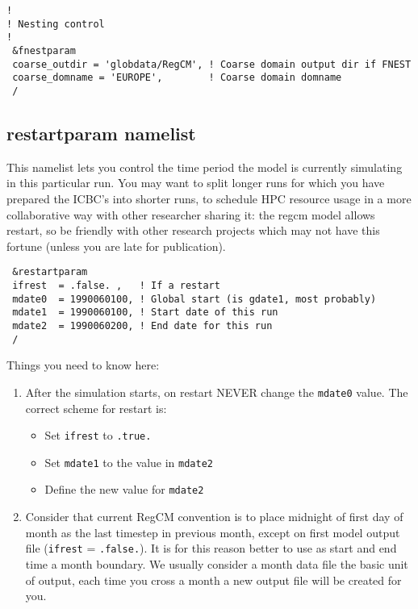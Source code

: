 {\footnotesize
\begin{Verbatim}
!
! Nesting control
!
 &fnestparam
 coarse_outdir = 'globdata/RegCM', ! Coarse domain output dir if FNEST
 coarse_domname = 'EUROPE',        ! Coarse domain domname
 /
\end{Verbatim}
}

\subsection{restartparam namelist}

This namelist lets you control the time period the model is currently simulating
in this particular run. You may want to split longer runs for which you have
prepared the ICBC's into shorter runs, to schedule HPC resource usage in a more
collaborative way with other researcher sharing it: the regcm model allows
restart, so be friendly with other research projects which may not have this
fortune (unless you are late for publication).

{\footnotesize
\begin{Verbatim}
 &restartparam
 ifrest  = .false. ,   ! If a restart
 mdate0  = 1990060100, ! Global start (is gdate1, most probably)
 mdate1  = 1990060100, ! Start date of this run
 mdate2  = 1990060200, ! End date for this run
 /
\end{Verbatim}
}

Things you need to know here:

\begin{enumerate}
\item After the simulation starts, on restart NEVER change the \verb=mdate0=
value. The correct scheme for restart is:
\begin{itemize}
\item Set \verb=ifrest= to \verb=.true.=
\item Set \verb=mdate1= to the value in \verb=mdate2=
\item Define the new value for \verb=mdate2=
\end{itemize}
\item Consider that current RegCM convention is to place midnight of first
day of month as the last timestep in previous month, except on first model
output file (\verb=ifrest= = \verb=.false.=). It is for this reason better
to use as start and end time a month boundary. We usually consider a month
data file the basic unit of output, each time you cross a month a new output
file will be created for you.
\end{enumerate}


